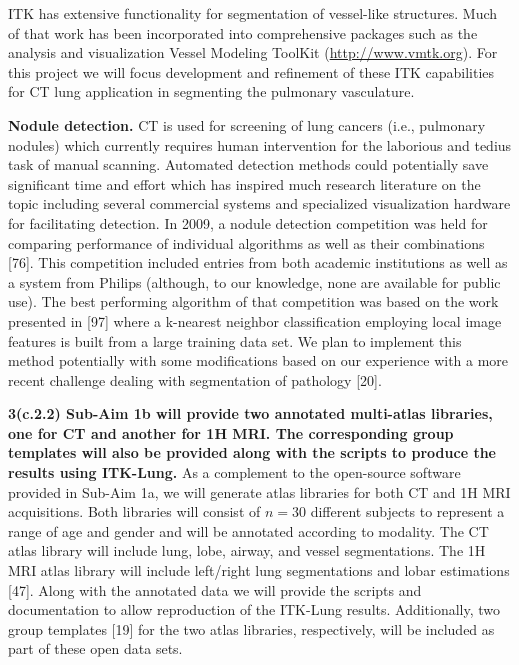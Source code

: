 \documentclass[11pt,]{article}
\begin{document}
ITK has extensive functionality for segmentation of vessel-like
structures. Much of that work has been incorporated into comprehensive
packages such as the analysis and visualization Vessel Modeling ToolKit
(\url{http://www.vmtk.org}). For this project we will focus development
and refinement of these ITK capabilities for CT lung application in
segmenting the pulmonary vasculature.

\textbf{Nodule detection.} CT is used for screening of lung cancers
(i.e., pulmonary nodules) which currently requires human intervention
for the laborious and tedius task of manual scanning. Automated
detection methods could potentially save significant time and effort
which has inspired much research literature on the topic including
several commercial systems and specialized visualization hardware for
facilitating detection. In 2009, a nodule detection competition was held
for comparing performance of individual algorithms as well as their
combinations {[}76{]}. This competition included entries from both
academic institutions as well as a system from Philips (although, to our
knowledge, none are available for public use). The best performing
algorithm of that competition was based on the work presented in
{[}97{]} where a k-nearest neighbor classification employing local image
features is built from a large training data set. We plan to implement
this method potentially with some modifications based on our experience
with a more recent challenge dealing with segmentation of pathology
{[}20{]}.

\textbf{3(c.2.2) Sub-Aim 1b will provide two annotated multi-atlas
libraries, one for CT and another for 1H MRI. The corresponding group
templates will also be provided along with the scripts to produce the
results using ITK-Lung.} As a complement to the open-source software
provided in Sub-Aim 1a, we will generate atlas libraries for both CT and
1H MRI acquisitions. Both libraries will consist of $n=30$ different
subjects to represent a range of age and gender and will be annotated
according to modality. The CT atlas library will include lung, lobe,
airway, and vessel segmentations. The 1H MRI atlas library will include
left/right lung segmentations and lobar estimations {[}47{]}. Along with
the annotated data we will provide the scripts and documentation to
allow reproduction of the ITK-Lung results. Additionally, two group
templates {[}19{]} for the two atlas libraries, respectively, will be
included as part of these open data sets.
\end{document}
